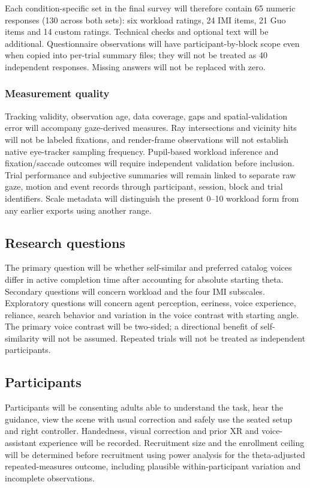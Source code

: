 \documentclass[11pt,letterpaper]{article}
\begin{document}
Each condition-specific set in the final survey will therefore contain 65 numeric responses (130 across both sets): six workload ratings, 24 IMI items, 21 Guo items and 14 custom ratings. Technical checks and optional text will be additional. Questionnaire observations will have participant-by-block scope even when copied into per-trial summary files; they will not be treated as 40 independent responses. Missing answers will not be replaced with zero.

\subsubsection{Measurement quality}
Tracking validity, observation age, data coverage, gaps and spatial-validation error will accompany gaze-derived measures. Ray intersections and vicinity hits will not be labeled fixations, and render-frame observations will not establish native eye-tracker sampling frequency. Pupil-based workload inference and fixation/saccade outcomes will require independent validation before inclusion. Trial performance and subjective summaries will remain linked to separate raw gaze, motion and event records through participant, session, block and trial identifiers. Scale metadata will distinguish the present 0--10 workload form from any earlier exports using another range.

\subsection{Research questions}
The primary question will be whether self-similar and preferred catalog voices differ in active completion time after accounting for absolute starting theta. Secondary questions will concern workload and the four IMI subscales. Exploratory questions will concern agent perception, eeriness, voice experience, reliance, search behavior and variation in the voice contrast with starting angle. The primary voice contrast will be two-sided; a directional benefit of self-similarity will not be assumed. Repeated trials will not be treated as independent participants.

\subsection{Participants}
Participants will be consenting adults able to understand the task, hear the guidance, view the scene with usual correction and safely use the seated setup and right controller. Handedness, visual correction and prior XR and voice-assistant experience will be recorded. Recruitment size and the enrollment ceiling will be determined before recruitment using power analysis for the theta-adjusted repeated-measures outcome, including plausible within-participant variation and incomplete observations.
\end{document}
